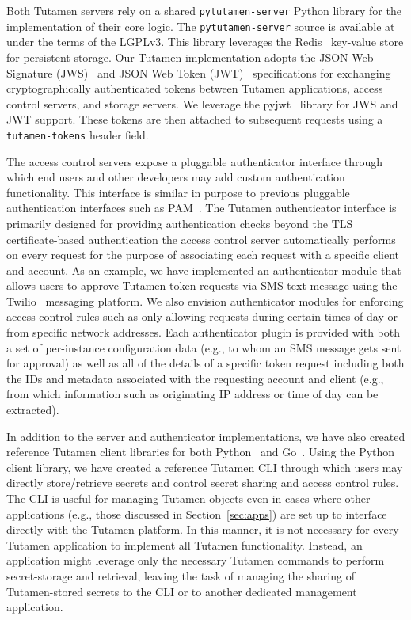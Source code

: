 Both Tutamen servers rely on a shared \texttt{pytutamen-server} Python
library for the implementation of their core logic. The
\texttt{pytutamen-server} source is available
at~\cite{src-tutamen-pytutamenserver} under the terms of the
LGPLv3. This library leverages the Redis~\cite{redis} key-value store
for persistent storage. Our Tutamen implementation adopts the JSON Web
Signature (JWS)~\cite{rfc7515} and JSON Web Token (JWT)~\cite{rfc7519}
specifications for exchanging cryptographically authenticated tokens
between Tutamen applications, access control servers, and storage
servers. We leverage the pyjwt~\cite{pyjwt} library for JWS and JWT
support. These tokens are then attached to subsequent requests using a
\texttt{tutamen-tokens} header field.

The access control servers expose a pluggable authenticator interface
through which end users and other developers may add custom
authentication functionality. This interface is similar in purpose to
previous pluggable authentication interfaces such as
PAM~\cite{samar1996}. The Tutamen authenticator interface is primarily
designed for providing authentication checks beyond the TLS
certificate-based authentication the access control server
automatically performs on every request for the purpose of associating
each request with a specific client and account. As an example, we have
implemented an authenticator module that allows users to approve
Tutamen token requests via SMS text message using the
Twilio~\cite{twilio} messaging platform. We also envision
authenticator modules for enforcing access control rules such as only
allowing requests during certain times of day or from specific network
addresses. Each authenticator plugin is provided with both a set of
per-instance configuration data (e.g., to whom an SMS message gets sent
for approval) as well as all of the details of a specific token
request including both the IDs and metadata associated with the
requesting account and client (e.g., from which information such as
originating IP address or time of day can be extracted).

In addition to the server and authenticator implementations, we have
also created reference Tutamen client libraries for both
Python~\cite{src-tutamen-pytutamen} and
Go~\cite{src-tutamen-go}. Using the Python client library, we have
created a reference Tutamen CLI through which users may directly
store/retrieve secrets and control secret sharing and access control
rules. The CLI is useful for managing Tutamen objects even in cases
where other applications (e.g., those discussed in
Section~\ref{sec:apps}) are set up to interface directly with the
Tutamen platform. In this manner, it is not necessary for every Tutamen
application to implement all Tutamen functionality. Instead, an
application might leverage only the necessary Tutamen commands to
perform secret-storage and retrieval, leaving the task of managing the
sharing of Tutamen-stored secrets to the CLI or to another dedicated
management application.

